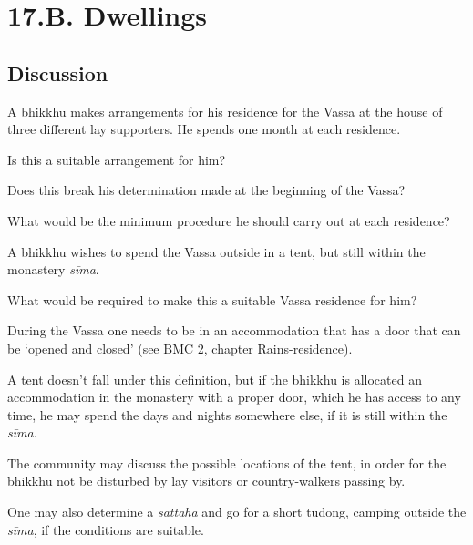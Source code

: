 \chapter{17.B. Dwellings}
\renewcommand*{\theChapterTitle}{17.B. Dwellings}

\section*{Discussion}

A bhikkhu makes arrangements for his residence for the Vassa at the house of three different lay supporters. He spends one month at each residence.

Is this a suitable arrangement for him?

Does this break his determination made at the beginning of the Vassa?

What would be the minimum procedure he should carry out at each residence?

\bigskip

A bhikkhu wishes to spend the Vassa outside in a tent, but still within the monastery \emph{sīma}.

What would be required to make this a suitable Vassa residence for him?

\begin{solution}
  During the Vassa one needs to be in an accommodation that has a door that can
  be `opened and closed' (see BMC 2, chapter Rains-residence).

  A tent doesn't fall under this definition, but if the bhikkhu is allocated an
  accommodation in the monastery with a proper door, which he has access to any
  time, he may spend the days and nights somewhere else, if it is still within
  the \emph{sīma}.

  The community may discuss the possible locations of the tent, in order for the
  bhikkhu not be disturbed by lay visitors or country-walkers passing by.

  One may also determine a \emph{sattaha} and go for a short tudong, camping
  outside the \emph{sīma}, if the conditions are suitable.
\end{solution}
